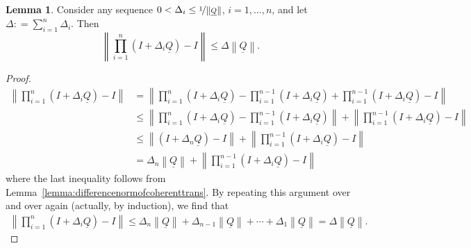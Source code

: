 \documentclass[10pt]{paper}
\theoremstyle{definition}
\newtheorem{lemma}[theorem]{Lemma}
\newcommand{\lrate}{\underline{Q}}
\newcommand{\norm}[1]{\left\lVert #1 \right\rVert}
\newcommand{\coloneqq}{:\!=}
\begin{document}
\begin{lemma}\label{lemma:justtheindicator_appendix}
Consider any sequence $0<\Delta_i\leq\nicefrac{1}{\norm{\lrate}}$, $i=1,\dots,n$, and let $\Delta\coloneqq\sum_{i=1}^n\Delta_i$. Then
\begin{equation*}
\norm{\prod_{i=1}^n(I+\Delta_i\lrate)-I}\leq\Delta\norm{\lrate}.
\end{equation*}
\end{lemma}
\begin{proof}
\begin{align*}
\norm{\prod_{i=1}^n(I+\Delta_i\lrate)-I}
&=\norm{\prod_{i=1}^n(I+\Delta_i\lrate)-\prod_{i=1}^{n-1}(I+\Delta_i\lrate)+\prod_{i=1}^{n-1}(I+\Delta_i\lrate)-I}\\
&\leq\norm{\prod_{i=1}^n(I+\Delta_i\lrate)-\prod_{i=1}^{n-1}(I+\Delta_i\lrate)}+\norm{\prod_{i=1}^{n-1}(I+\Delta_i\lrate)-I}\\
&\leq\norm{(I+\Delta_n\lrate)-I}+\norm{\prod_{i=1}^{n-1}(I+\Delta_i\lrate)-I}\\
&=\Delta_n\norm{\lrate}+\norm{\prod_{i=1}^{n-1}(I+\Delta_i\lrate)-I}
\end{align*}
where the last inequality follows from Lemma~\ref{lemma:differencenormofcoherenttrans}. By repeating this argument over and over again (actually, by induction), we find that
\begin{align*}
\norm{\prod_{i=1}^n(I+\Delta_i\lrate)-I}
\leq \Delta_n\norm{\lrate} +\Delta_{n-1}\norm{\lrate}+\cdots
+\Delta_1\norm{\lrate}
=\Delta\norm{\lrate}.
\end{align*}
\end{proof}
\end{document}
